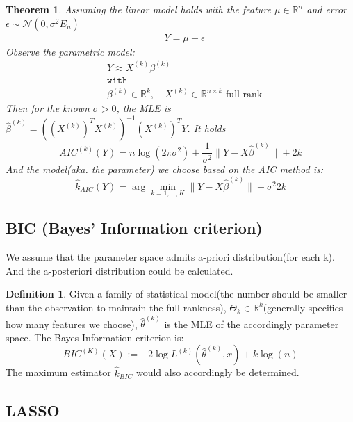 \documentclass[a4paper,12pt, oneside, fleqn]{book}
\newtheorem{theorem}{Theorem}[section]
\theoremstyle{definition}
\newtheorem{definition}{Definition}[section]
\theoremstyle{remark}
\begin{document}
\begin{theorem}
Assuming the linear model holds with the feature $\mu \in \mathbb{R}^n$ and error $\epsilon \sim \mathcal{N}(0, \sigma^2 E_n)$
\begin{align*}
	& Y = \mu + \epsilon
\end{align*}
Observe the parametric model:
\begin{align*}
	&Y \approx X^{(k)} \beta^{(k)}\\
	&\texttt{with}\\
	&\beta^{(k)} \in \mathbb{R}^k , \quad X^{(k)} \in \mathbb{R}^{n \times k} \text{ full rank}
\end{align*}
 Then for the known $\sigma > 0$, the MLE is $\hat{\beta}^{(k)} = ((X^{(k)})^T X^{(k)})^{-1} (X^{(k)})^T Y$. It holds
\begin{equation}
    AIC^{(k)}(Y) = n \log (2\pi \sigma^2) + \frac{1}{\sigma^2} \|Y - X\hat{\beta}^{(k)} \| + 2k
\end{equation}
And the model(aka. the parameter) we choose based on the AIC method is:
\begin{equation}
    \hat{k}_{AIC}(Y) = \arg\min_{k = 1, \dots, K} \|Y - X\hat{\beta}^{(k)} \| + \sigma^2 2k
\end{equation}
\end{theorem}



\subsection{BIC (Bayes' Information criterion)}
We assume that the parameter space admits a-priori distribution(for each k). And the a-posteriori distribution could be calculated. 

\begin{definition}
Given a family of statistical model(the number should be smaller than the observation to maintain the full rankness), $\Theta_k \in \mathbb{R}^k$(generally specifies how many features we choose), $\hat{\theta}^{(k)}$ is the MLE of the accordingly parameter space. The Bayes Information criterion is:
\begin{equation}
    BIC^{(K)}(X) := -2\log L^{(k)}(\hat{\theta}^{(k)}, x) + k\log(n)
\end{equation}
The maximum estimator $\hat{k}_{BIC}$ would also accordingly be determined. 
\end{definition}


\subsection{LASSO}
\end{document}
